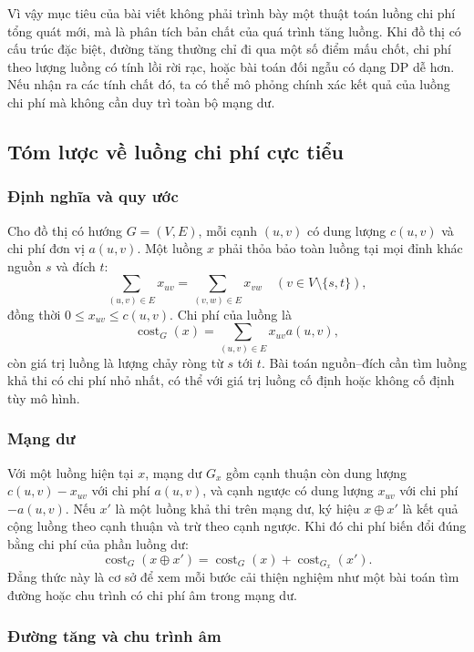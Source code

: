 \documentclass[11pt]{article}
\begin{document}
Vì vậy mục tiêu của bài viết không phải trình bày một thuật toán luồng chi phí
tổng quát mới, mà là phân tích bản chất của quá trình tăng luồng. Khi đồ thị có
cấu trúc đặc biệt, đường tăng thường chỉ đi qua một số điểm mấu chốt, chi phí
theo lượng luồng có tính lồi rời rạc, hoặc bài toán đối ngẫu có dạng DP dễ hơn.
Nếu nhận ra các tính chất đó, ta có thể mô phỏng chính xác kết quả của luồng chi
phí mà không cần duy trì toàn bộ mạng dư.

\subsection{Tóm lược về luồng chi phí cực tiểu}

\subsubsection{Định nghĩa và quy ước}

Cho đồ thị có hướng $G=(V,E)$, mỗi cạnh $(u,v)$ có dung lượng $c(u,v)$ và chi
phí đơn vị $a(u,v)$. Một luồng $x$ phải thỏa bảo toàn luồng tại mọi đỉnh khác
nguồn $s$ và đích $t$:
\[
  \sum_{(u,v)\in E} x_{uv} = \sum_{(v,w)\in E} x_{vw}
  \quad (v\in V\setminus\{s,t\}),
\]
đồng thời $0\le x_{uv}\le c(u,v)$. Chi phí của luồng là
\[
  \operatorname{cost}_G(x)=\sum_{(u,v)\in E} x_{uv}a(u,v),
\]
còn giá trị luồng là lượng chảy ròng từ $s$ tới $t$. Bài toán nguồn--đích cần
tìm luồng khả thi có chi phí nhỏ nhất, có thể với giá trị luồng cố định hoặc
không cố định tùy mô hình.

\subsubsection{Mạng dư}

Với một luồng hiện tại $x$, mạng dư $G_x$ gồm cạnh thuận còn dung lượng
$c(u,v)-x_{uv}$ với chi phí $a(u,v)$, và cạnh ngược có dung lượng $x_{uv}$ với
chi phí $-a(u,v)$. Nếu $x'$ là một luồng khả thi trên mạng dư, ký hiệu
$x\oplus x'$ là kết quả cộng luồng theo cạnh thuận và trừ theo cạnh ngược. Khi
đó chi phí biến đổi đúng bằng chi phí của phần luồng dư:
\[
  \operatorname{cost}_G(x\oplus x')=
  \operatorname{cost}_G(x)+\operatorname{cost}_{G_x}(x').
\]
Đẳng thức này là cơ sở để xem mỗi bước cải thiện nghiệm như một bài toán tìm
đường hoặc chu trình có chi phí âm trong mạng dư.

\subsubsection{Đường tăng và chu trình âm}
\end{document}
